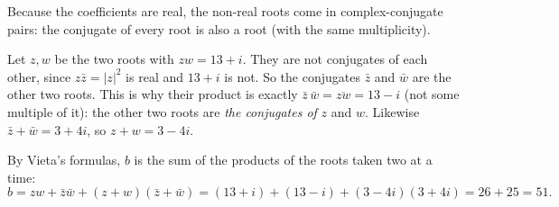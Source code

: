 Because the coefficients are real, the non-real roots come in complex-conjugate pairs: the conjugate of every root is also a root (with the same multiplicity).

Let $z,w$ be the two roots with $zw=13+i$. They are not conjugates of each other, since $z\bar z=|z|^2$ is real and $13+i$ is not. So the conjugates $\bar z$ and $\bar w$ are the other two roots. This is why their product is exactly $\bar z\,\bar w=\overline{zw}=13-i$ (not some multiple of it): the other two roots are \emph{the conjugates of} $z$ and $w$. Likewise $\bar z+\bar w=3+4i$, so $z+w=3-4i$.

By Vieta's formulas, $b$ is the sum of the products of the roots taken two at a time:
\[
b=zw+\bar z\bar w+(z+w)(\bar z+\bar w)=(13+i)+(13-i)+(3-4i)(3+4i)=26+25=\boxed{51}.
\]
